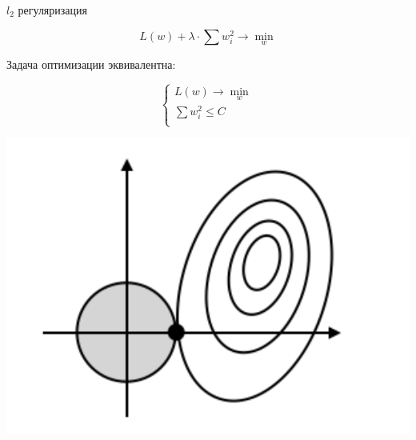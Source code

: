 \documentclass[notes,12pt, aspectratio=169]{beamer}
\begin{document}
\begin{frame}{$l_2$ регуляризация}

\[L(w) + \lambda \cdot  \sum w_i^2  \to \min_{w}\]

Задача оптимизации эквивалентна:

\[
\begin{cases} 
L(w) \to \min_{w} \\
\sum w_i^2 \le C \\
\end{cases}
\]

\begin{center}
	\includegraphics[width=0.35\paperwidth]{l2reg.png}
\end{center}
\end{frame}
\end{document}
